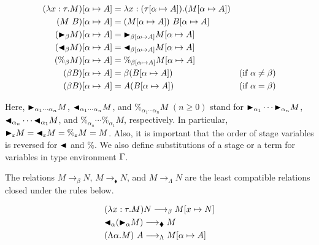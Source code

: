 \begin{align*}
    (\lambda x:\tau.M)[\alpha \mapsto A] & = \lambda x:(\tau[\alpha \mapsto A]).(M[\alpha \mapsto A])                                  \\
    (M\ B)[\alpha \mapsto A]             & = (M[\alpha \mapsto A])\ B[\alpha\mapsto A]                                                 \\
    ({\mathop{\blacktriangleright}}_\beta M)[\alpha \mapsto A]      & = {\mathop{\blacktriangleright}}_{\beta[\alpha \mapsto A]}M[\alpha \mapsto A]                                          \\
    ({\mathop{\blacktriangleleft}}_\beta M)[\alpha \mapsto A]     & = {\mathop{\blacktriangleleft}}_{\beta[\alpha \mapsto A]}M[\alpha \mapsto A]                                         \\
    (\%_\beta M)[\alpha \mapsto A]       & = \%_{\beta[\alpha \mapsto A]}M[\alpha \mapsto A]                                           \\
    (\beta B)[\alpha \mapsto A]          & = \beta (B[\alpha\mapsto A])                               & (\text{if } \alpha \neq \beta) \\
    (\beta B)[\alpha \mapsto A]          & = A (B[\alpha\mapsto A])                                   & (\text{if } \alpha = \beta)
\end{align*}


Here, ${\mathop{\blacktriangleright}}_{\alpha_1\cdots\alpha_n} M$, ${\mathop{\blacktriangleleft}}_{\alpha_1\cdots\alpha_n} M$, and
$\%_{\alpha_1\cdots\alpha_n} M$ $(n \geq 0)$ stand for ${\mathop{\blacktriangleright}}_{\alpha_1} \cdots
{\mathop{\blacktriangleright}}_{\alpha_n} M$, ${\mathop{\blacktriangleleft}}_{\alpha_n}\cdots {\mathop{\blacktriangleleft}}_{\alpha_1} M$, and
$\%_{\alpha_n}\cdots \%_{\alpha_1} M$, respectively.  In particular,
${\mathop{\blacktriangleright}}_{\varepsilon} M = {\mathop{\blacktriangleleft}}_{\varepsilon} M = \%_{\varepsilon} M = M$.  Also,
it is important that the order of stage variables is reversed for ${\mathop{\blacktriangleleft}}$ and
$\%$.  We also define substitutions of a stage or a term for variables in type
environment $\Gamma$.


\begin{definition}[Reduction]
    The relations $M \longrightarrow_\beta N$, $M \longrightarrow_\blacklozenge N$, and $M \longrightarrow_\Lambda N$ are the least compatible relations closed under the rules below.
\begin{center}
  \begin{align*}
     & (\lambda x:\tau.M) N \longrightarrow_\beta M[x \mapsto N]         \\
     & {\mathop{\blacktriangleleft}}_\alpha ({\mathop{\blacktriangleright}}_\alpha M)\longrightarrow_\blacklozenge M         \\
     & (\Lambda \alpha.M)\ A \longrightarrow_\Lambda M[\alpha \mapsto A]
  \end{align*}
\end{center}
\end{definition}

